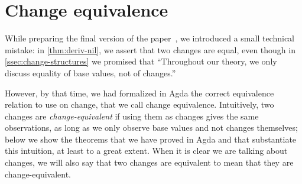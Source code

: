 \section{Change equivalence}
\label{sec:change-eq}

While preparing the final version of the paper~\citep{CaiEtAl2014ILC}, we introduced a
small technical mistake: in \cref{thm:deriv-nil}, we assert that
two changes are equal, even though in
\cref{ssec:change-structures} we promised that ``Throughout
our theory, we only discuss equality of base values, not of
changes.''

However, by that time, we had formalized in Agda the correct
equivalence relation to use on change, that we call change
equivalence. Intuitively, two changes are
\emph{change-equivalent} if using them as changes gives the same
observations, as long as we only observe base values and not
changes themselves; below we show the theorems that we have
proved in Agda and that substantiate this intuition, at least to
a great extent. When it is clear we are talking about changes, we
will also say that two changes are equivalent to mean that they
are change-equivalent.







